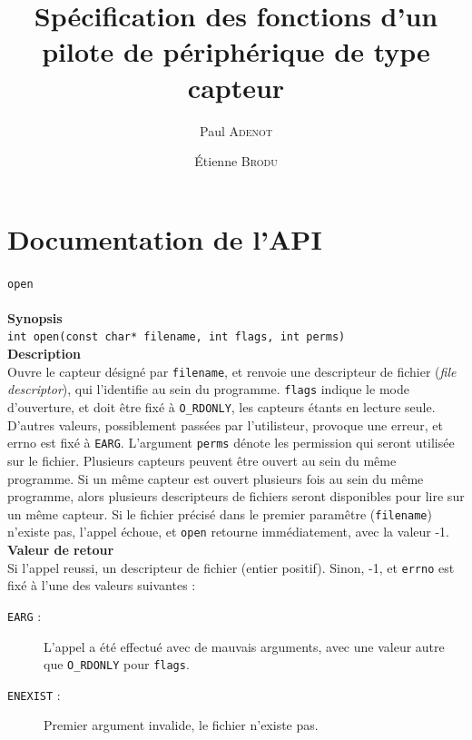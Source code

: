 \documentclass[11pt, a4paper]{article}
\title{Spécification des fonctions d'un pilote de périphérique de type capteur}
\author{Paul \textsc{Adenot} \and \'{E}tienne \textsc{Brodu}}
\date{}
\begin{document}
\maketitle

\newcommand{\kw}[1]{\texttt{#1}}

\newcommand{\DescFonction}[4]{%
	\texttt{\Huge{#1}} \\ 
	\raisebox{0.5em}{\rule{\textwidth}{0.1ex}}\\
	\textbf{\large{Synopsis}} \\
	\texttt{#2} \\
	\textbf{\large{Description}} \\
	#3 \\
	\textbf{\large{Valeur de retour}} \\
	#4 
	\vspace{1cm}
}


\newcommand{\Test}[3]
{%
	\addtocounter{testno}{1}
	\textbf{\large{Test \thetestno~-- #1}}\\
	\raisebox{0.5em}{\rule{\textwidth}{0.1ex}}\\
	\textbf{\large{Description}}\\
	#2 \\
	\textbf{\large{Resultat attendu}}\\
	#3 
}

\section{Documentation de l'API}
\DescFonction{open}
{int open(const char* filename, int flags, int perms)}
{Ouvre le capteur désigné par \kw{filename}, et renvoie une descripteur de
fichier (\emph{file descriptor}), qui l'identifie au sein du programme. 
\kw{flags} indique le mode d'ouverture, et doit être fixé à \kw{O\_RDONLY},
les capteurs étants en lecture seule. D'autres valeurs, possiblement passées
par l'utilisteur, provoque une erreur, et errno est fixé à \kw{EARG}.
L'argument \kw{perms} dénote les permission qui seront utilisée sur le fichier.
Plusieurs capteurs peuvent être ouvert 
au sein du même programme. Si un même capteur est ouvert plusieurs fois au
sein du même programme, alors plusieurs descripteurs de fichiers seront
disponibles pour lire sur un même capteur. Si le fichier précisé dans le 
premier paramêtre (\kw{filename}) n'existe pas, l'appel échoue, et \kw{open}
retourne immédiatement, avec la valeur -1.}
{Si l'appel reussi, un descripteur de fichier (entier positif). Sinon, 
-1, et \kw{errno} est fixé à l'une des valeurs suivantes :
\begin{description}
	\item[\kw{EARG} : ] L'appel a été effectué avec de mauvais arguments,
			avec une valeur autre que \kw{O\_RDONLY} pour \kw{flags}.
	\item[\kw{ENEXIST} : ] Premier argument invalide, le fichier n'existe pas.
\end{description}
}
\end{document}

